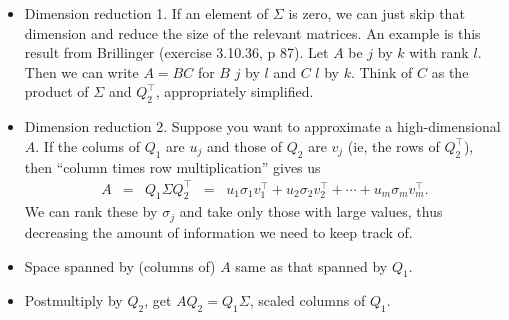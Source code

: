 \documentclass[11pt]{article}
\begin{document}
\begin{itemize}
\item Dimension reduction 1.
If an element of $\Sigma$ is zero,
we can just skip that dimension and reduce the size
of the relevant matrices.
An example is this result from Brillinger (exercise 3.10.36, p 87).
Let $A$ be $j$ by $k$ with rank $l$.
Then we can write $A=BC$ for $B$ $j$ by $l$ and $C$ $l$ by $k$.
Think of $C$ as the product of $\Sigma$ and $Q_2^\top$, appropriately simplified.

\item Dimension reduction 2.  Suppose you want to approximate a high-dimensional $A$.
If the colums of $Q_1$ are $u_j$ and those of $Q_2$ are $v_j$ (ie, the rows of $Q_2^\top$), then ``column times row multiplication'' gives us
\begin{eqnarray*}
    A &=& Q_1 \Sigma Q_2^\top
        \;\;=\;\; u_1 \sigma_1 v_1^\top + u_2 \sigma_2 v_2^\top + \cdots + u_m \sigma_m v_m^\top .
\end{eqnarray*}
We can rank these by $\sigma_j$ and take only those with large values,
thus decreasing the amount of information we need to keep track of.


\item Space spanned by (columns of) $A$ same as that spanned by $Q_1$.
\item Postmultiply by $Q_2$, get $ A Q_2 = Q_1 \Sigma$, scaled columns of $Q_1$.

\end{itemize}
\end{document}
